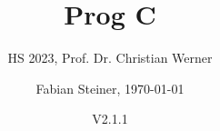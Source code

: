\documentclass[fontsize=8pt, a4paper, fleqn, landscape, DIV=calc]{scrartcl}
\title{\vspace{-1cm}Prog C}
\subtitle{HS 2023, Prof. Dr. Christian Werner}
\author{Fabian Steiner, \today}
\date{{\small V2.1.1}}
\begin{document}
	\begin{multicols*}{3}
        \raggedcolumns
        \begin{minipage}{0.75\columnwidth}
		      \maketitle
        \end{minipage}
        \begin{minipage}{0.2\columnwidth}
            \begin{center}
                \quad
                \qquad    
            \end{center}
        \end{minipage}
        
        \thispagestyle{fancy}%

        
        
        
        
        
        
        
        
        
	\end{multicols*}	
\end{document}
